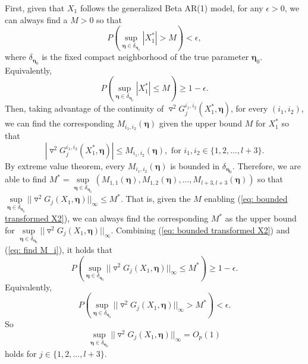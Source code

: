 \documentclass{article}
\theoremstyle{definition}
\begin{document}
First, given that $X_1$ follows the generalized Beta AR(1) model, for any $\epsilon>0$, we can always find a $M>0$ so that
\begin{equation*}
\label{eq: bounded transformed X1}
    P(\underset{\bm{\eta} \in \delta_{\bm{\eta}_0}}{\sup}|X^*_1|>M) <\epsilon,
\end{equation*}
where $\delta_{\bm{\eta}_0}$ is the fixed compact neighborhood of the true parameter $\bm{\eta}_0$. Equivalently,
\begin{equation}
\label{eq: bounded transformed X2}
        P(\underset{\bm{\eta} \in \delta_{\bm{\eta}_0}}{\sup}|X^*_1| \leq M) \geq 1-\epsilon.
\end{equation}
Then, taking advantage of the continuity of $\triangledown^2 G_j^{i_1,i_2}(X^*_1,\bm{\eta})$, for every $(i_1,i_2)$, we can find the corresponding $M_{i_1,i_2}(\bm{\eta})$ given the upper bound $M$ for $X^*_1$ so that 
\begin{equation}
\label{eq: find M_i}
    |\triangledown^2 G_j^{i_1,i_2}(X^*_1,\bm{\eta})| \leq M_{i_1,i_2}(\bm{\eta}), \text{ for }i_1,i_2 \in \{1,2,...,l+3\}.
\end{equation}
By extreme value theorem, every $M_{i_1,i_2}(\bm{\eta})$ is bounded in $\delta_{\bm{\eta}_0}$. Therefore, we are able to find $M^* = \underset{\bm{\eta} \in \delta_{\bm{\eta}_0}}{\sup}(M_{1,1}(\bm{\eta}),M_{1,2}(\bm{\eta}),...,M_{l+3,l+3}(\bm{\eta}))$ so that $\underset{\bm{\eta} \in \delta_{\bm{\eta}_0}}{\sup} ||\triangledown^2 G_j(X_1,\bm{\eta})||_{\infty} \leq M^*.$ That is, given the $M$ enabling (\ref{eq: bounded transformed X2}), we can always find the corresponding $M^*$ as the upper bound for $\underset{\bm{\eta} \in \delta_{\bm{\eta}_0}}{\sup} ||\triangledown^2 G_j(X_1,\bm{\eta})||_{\infty}$. Combining (\ref{eq: bounded transformed X2}) and (\ref{eq: find M_i}), it holds that 
\begin{equation}
   P(\underset{\bm{\eta} \in \delta_{\bm{\eta}_0}}{\sup} ||\triangledown^2 G_j(X_1,\bm{\eta})||_{\infty} \leq M^*) \geq 1-\epsilon.
\end{equation}
Equivalently, 
\begin{equation}
    P(\underset{\bm{\eta} \in \delta_{\bm{\eta}_0}}{\sup} ||\triangledown^2 G_j(X_1,\bm{\eta})||_{\infty} >M^*) <\epsilon.
\end{equation}
So 
\begin{equation*}
    \underset{\bm{\eta} \in \delta_{\bm{\eta}_0}}{\sup} ||\triangledown^2 G_j(X_1,\bm{\eta})||_{\infty} =O_p(1)
\end{equation*}
holds for $j \in \{1,2,...,l+3\}$. 
\end{document}
